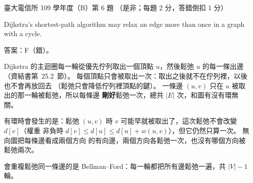 \begin{pastexam}[label={px:ntu-109-comm-dsa-06}]{臺大電信所 109 學年度（B）第 6 題}
（是非；每題 2 分，答錯倒扣 1 分）

Dijkstra's shortest-path algorithm may relax an edge more than once in a graph with a cycle.
\end{pastexam}

\begin{pastsoln}
答案：F（錯）。

Dijkstra 的主迴圈每一輪從優先佇列取出一個頂點 $u$，然後鬆弛 $u$ 的每一條出邊
（資結書第~25.2~節）。 每個頂點只會被取出一次：取出之後就不在佇列裡，以後也不會再放回去
（鬆弛只會降低佇列裡頂點的鍵）。 一條邊 $(u, v)$ 只在 $u$ 被取出的那一輪被鬆弛，所以每條邊
\textbf{剛好}鬆弛一次，總共 $|E|$ 次，和圖有沒有環無關。

有環時會發生的是：鬆弛 $(u, v)$ 時 $v$ 可能早就被取出了，這次鬆弛不會改變 $d[v]$（權重
非負時 $d[v] \le d[u] \le d[u] + w(u, v)$），但它仍然只算一次。 無向圖把每條邊看成兩個方向
的有向邊，兩個方向各鬆弛一次，也沒有哪個方向被鬆弛兩次。

會重複鬆弛同一條邊的是 Bellman--Ford：每一輪都把所有邊鬆弛一遍，共 $|V| - 1$ 輪。
\end{pastsoln}
